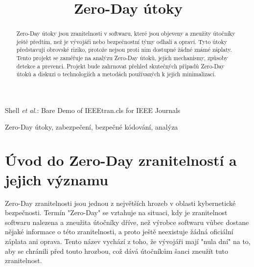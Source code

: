 \documentclass[11pt, conference, a4paper]{IEEEtran}
\begin{document}
\title{Zero-Day \' utoky}


\author{
}





%
{Shell \MakeLowercase{\textit{et al.}}: Bare Demo of IEEEtran.cls for IEEE Journals}



\maketitle

\begin{abstract}
Zero-Day útoky jsou zranitelnosti v softwaru, které jsou objeveny a zneužity útočníky ještě předtím, než je vývojáři nebo bezpečnostní týmy odhalí a opraví. Tyto útoky představují obrovské riziko, protože nejsou proti nim dostupné žádné známé záplaty. Tento projekt se zaměřuje na analýzu Zero-Day útoků, jejich mechanismy, způsoby detekce a prevenci. Projekt bude zahrnovat přehled skutečných případů Zero-Day útoků a diskuzi o technologiích a metodách používaných k jejich minimalizaci.
\end{abstract}

\begin{IEEEkeywords}
Zero-Day útoky, zabezpečení, bezpečné k\' odování, analýza
\end{IEEEkeywords}


\IEEEpeerreviewmaketitle



\section{Úvod do Zero-Day zranitelností a jejich významu}
Zero-Day zranitelnosti jsou jednou z největších hrozeb v oblasti kybernetické bezpečnosti. Termín "Zero-Day" se vztahuje na situaci, kdy je zranitelnost softwaru nalezena a zneužita útočníky dříve, než výrobce softwaru v\r ubec dostane nějaké informace o této zranitelnosti, a proto ještě neexistuje žádná oficiální záplata ani oprava. Tento název vychází z toho, že vývojáři mají "nula dní" na to, aby se chránili před touto hrozbou, což dává útočníkům šanci zneužít tuto zranitelnost.
\end{document}
